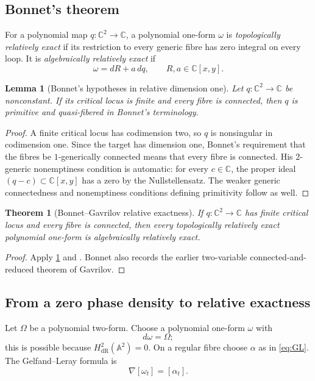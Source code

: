 \documentclass[11pt]{article}
\numberwithin{equation}{section}
\newtheorem{theorem}{Theorem}[section]
\newtheorem{lemma}[lemma]{Lemma}
\theoremstyle{definition}
\theoremstyle{remark}
\newcommand{\C}{\mathbb C}
\newcommand{\Atwo}{\mathbb A^2}
\begin{document}
\subsection{Bonnet's theorem}

For a polynomial map $q:\C^2\to\C$, a polynomial one-form $\omega$ is
\emph{topologically relatively exact} if its restriction to every generic
fibre has zero integral on every loop.  It is \emph{algebraically relatively
exact} if
\[
  \omega=dR+a\,dq,
  \qquad R,a\in\C[x,y].
\]

\begin{lemma}[Bonnet's hypotheses in relative dimension one]
\label{lem:Bonnet-hypotheses}
Let $q:\C^2\to\C$ be nonconstant.  If its critical locus is finite and every
fibre is connected, then $q$ is primitive and quasi-fibered in Bonnet's
terminology.
\end{lemma}

\begin{proof}
A finite critical locus has codimension two, so $q$ is nonsingular in
codimension one.  Since the target has dimension one, Bonnet's requirement
that the fibres be $1$-generically connected means that every fibre is
connected.  His $2$-generic nonemptiness condition is automatic: for every
$c\in\C$, the proper ideal $(q-c)\subset\C[x,y]$ has a zero by the
Nullstellensatz.  The weaker generic connectedness and nonemptiness conditions
defining primitivity follow as well.
\end{proof}

\begin{theorem}[Bonnet--Gavrilov relative exactness]\label{thm:Bonnet}
If $q:\C^2\to\C$ has finite critical locus and every fibre is connected, then
every topologically relatively exact polynomial one-form is algebraically
relatively exact.
\end{theorem}

\begin{proof}
Apply \cref{lem:Bonnet-hypotheses} and
\cite[Theorem~1.5]{BonnetRelativeExactness}.  Bonnet also records the earlier
two-variable connected-and-reduced theorem of Gavrilov.
\end{proof}

\subsection{From a zero phase density to relative exactness}

Let $\Omega$ be a polynomial two-form.  Choose a polynomial one-form $\omega$
with
\begin{equation}\label{eq:domega}
  d\omega=\Omega;
\end{equation}
this is possible because $H^2_{\mathrm{dR}}(\Atwo)=0$.
On a regular fibre choose $\alpha$ as in \eqref{eq:GL}.  The
Gelfand--Leray formula is
\begin{equation}\label{eq:GM-derivative}
  \nabla[\omega_t]=[\alpha_t].
\end{equation}
\end{document}

